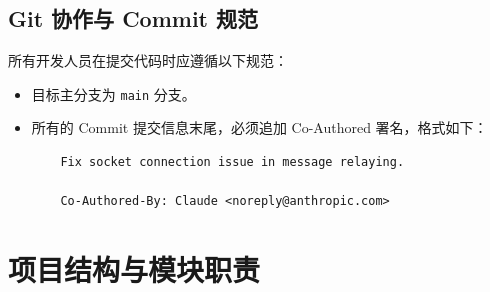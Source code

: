 \documentclass[UTF8]{ctexart}
\begin{document}
\subsection{Git 协作与 Commit 规范}
所有开发人员在提交代码时应遵循以下规范：
\begin{itemize}
    \item 目标主分支为 \texttt{main} 分支。
    \item 所有的 Commit 提交信息末尾，必须追加 Co-Authored 署名，格式如下：
    \begin{lstlisting}
    Fix socket connection issue in message relaying.
    
    Co-Authored-By: Claude <noreply@anthropic.com>
    \end{lstlisting}
\end{itemize}

\section{项目结构与模块职责}
\end{document}
